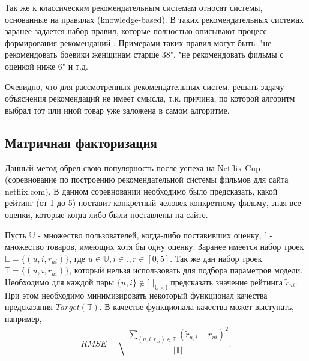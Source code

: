 \documentclass[12pt,a4paper]{report}
\begin{document}
Так же к классическим рекомендательным системам относят системы, основанные на правилах (knowledge-based). В таких рекомендательных системах заранее задается набор правил, которые полностью описывают процесс формирования рекомендаций \cite{Know}.
 Примерами таких правил могут быть: "не рекомендовать боевики женщинам старше 38", "не рекомендовать фильмы с оценкой ниже 6" и т.д. 

Очевидно, что для рассмотренных рекомендательных систем, решать задачу объяснения рекомендаций не имеет смысла, т.к. причина, по которой алгоритм выбрал тот или иной товар уже заложена в самом алгоритме.
\subsection{Матричная факторизация}
Данный метод обрел свою популярность после успеха на Netflix Cup (соревнование по построению рекомендательной системы фильмов для сайта netflix.com). В данном соревновании необходимо было предсказать, какой рейтинг (от 1 до 5) поставит конкретный человек конкретному фильму, зная все оценки, которые когда-либо были поставлены на сайте.

Пусть $\mathbb{U}$  - множество пользователей, когда-либо поставивших оценку, $\mathbb{I}$ - множество товаров, имеющих хотя бы одну оценку.
 Заранее имеется набор троек $\mathbb{L} = \{(u, i, r_{ui})\}$, где $u \in \mathbb{U}, i \in \mathbb{I}, r \in [0, 5]$. Так же дан набор троек $\mathbb{T} = \{(u, i, r_{ui})\}$, который нельзя использовать для подбора параметров модели. Необходимо для каждой пары $\{u,i\} \notin \mathbb{L}|_{\mathbb{U}\times\mathbb{I}}$ предсказать значение рейтинга $\tilde{r}_{ui}$. При этом необходимо минимизировать некоторый функционал качества предсказания $Target(\mathbb{T})$. В качестве функционала качества может выступать, например, 
\begin{equation*}
RMSE = \sqrt{\frac{\sum_{(u, i, r_{ui}) \in \mathbb{T}}(\tilde{r}_{u,i} - r_{ui})^2}{|\mathbb{T}|}}.
\end{equation*}
\end{document}
